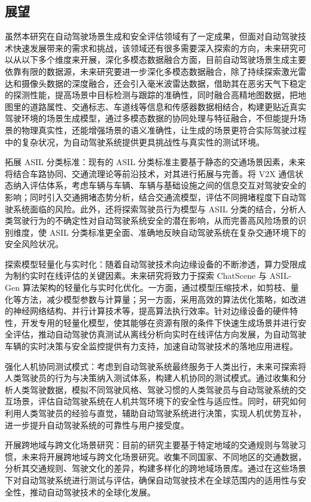 \subsection{展望}


虽然本研究在自动驾驶场景生成和安全评估领域有了一定成果，但面对自动驾驶技术快速发展带来的需求和挑战，该领域还有很多需要深入探索的方向，未来研究可以从以下多个维度来开展，深化多模态数据融合方面，目前自动驾驶场景生成主要依靠有限的数据源，未来研究要进一步深化多模态数据融合，除了持续探索激光雷达和摄像头数据的深度融合，还会引入毫米波雷达数据，借助其在恶劣天气下稳定的探测性能，提高场景中目标检测与跟踪的准确性，同时融合高精地图数据，把地图里的道路属性、交通标志、车道线等信息和传感器数据相结合，构建更贴近真实驾驶环境的场景生成模型，通过多模态数据的协同处理与特征融合，不但能提升场景的物理真实性，还能增强场景的语义准确性，让生成的场景更符合实际驾驶过程中的复杂状况，为自动驾驶系统提供更具挑战性与真实性的测试环境。​

拓展 ASIL 分类标准：现有的 ASIL 分类标准主要基于静态的交通场景因素，未来将结合车路协同、交通流理论等前沿技术，对其进行拓展与完善。将 V2X 通信状态纳入评估体系，考虑车辆与车辆、车辆与基础设施之间的信息交互对驾驶安全的影响；同时引入交通拥堵态势分析，结合交通流模型，评估不同拥堵程度下自动驾驶系统面临的风险。此外，还将探索驾驶员行为模型与 ASIL 分类的结合，分析人类驾驶行为的不确定性对自动驾驶系统安全的潜在影响，从而完善高风险场景的识别维度，使 ASIL 分类标准更全面、准确地反映自动驾驶系统在复杂交通环境下的安全风险状况。​

探索模型轻量化与实时化：随着自动驾驶技术向边缘设备的不断渗透，算力受限成为制约实时在线评估的关键因素。未来研究将致力于探索 ChatScene 与 ASIL-Gen 算法架构的轻量化与实时化优化。一方面，通过模型压缩技术，如剪枝、量化等方法，减少模型参数与计算量；另一方面，采用高效的算法优化策略，如改进的神经网络结构、并行计算技术等，提高算法执行效率。针对边缘设备的硬件特性，开发专用的轻量化模型，使其能够在资源有限的条件下快速生成场景并进行安全评估，推动自动驾驶仿真测试从离线分析向实时在线评估方向发展，为自动驾驶车辆的实时决策与安全监控提供有力支持，加速自动驾驶技术的落地应用进程。​

强化人机协同测试模式：考虑到自动驾驶系统最终服务于人类出行，未来可探索将人类驾驶员的行为与决策纳入测试体系，构建人机协同的测试模式。通过收集和分析人类驾驶数据，模拟不同驾驶风格、驾驶习惯的人类驾驶员与自动驾驶系统的交互场景，评估自动驾驶系统在人机共驾环境下的安全性与适应性。同时，研究如何利用人类驾驶员的经验与直觉，辅助自动驾驶系统进行决策，实现人机优势互补，进一步提升自动驾驶系统的可靠性与用户接受度。​

开展跨地域与跨文化场景研究：目前的研究主要基于特定地域的交通规则与驾驶习惯，未来将开展跨地域与跨文化场景研究。收集不同国家、不同地区的交通数据，分析其交通规则、驾驶文化的差异，构建多样化的跨地域场景库。通过在这些场景下对自动驾驶系统进行测试与评估，确保自动驾驶技术在全球范围内的适用性与安全性，推动自动驾驶技术的全球化发展。







\newpage



